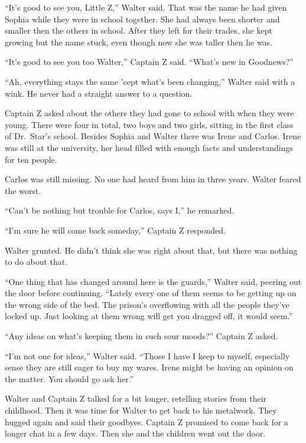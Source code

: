 \documentclass[12pt]{extbook}
\begin{document}
  \enquote{It's good to see you, Little Z,} Walter said. That was the name
  he had given Sophia while they were in school together. She had always
  been shorter and smaller then the others in school. After they left for
  their trades, she kept growing but the name stuck, even though now she
  was taller then he was.
  
  \enquote{It's good to see you too Walter,} Captain Z said.
  \enquote{What's new in Goodnews?}
  
  \enquote{Ah, everything stays the same 'cept what's been changing,}
  Walter said with a wink. He never had a straight answer to a question.
  
  Captain Z asked about the others they had gone to school with when they
  were young. There were four in total, two boys and two girls, sitting in
  the first class of Dr.~Star's school. Besides Sophia and Walter there
  was Irene and Carlos. Irene was still at the university, her head filled
  with enough facts and understandings for ten people.
  
  Carlos was still missing. No one had heard from him in three years.
  Walter feared the worst.
  
  \enquote{Can't be nothing but trouble for Carlos, says I,} he remarked.
  
  \enquote{I'm sure he will come back someday,} Captain Z responded.
  
  Walter grunted. He didn't think she was right about that, but there was
  nothing to do about that.
  
  \enquote{One thing that has changed around here is the guards,} Walter
  said, peering out the door before continuing. \enquote{Lately every one
  of them seems to be getting up on the wrong side of the bed. The
  prison's overflowing with all the people they've locked up. Just looking
  at them wrong will get you dragged off, it would seem.}
  
  \enquote{Any ideas on what's keeping them in such sour moods?} Captain Z
  asked.
  
  \enquote{I'm not one for ideas,} Walter said. \enquote{Those I have I
  keep to myself, especially sense they are still eager to buy my wares.
  Irene might be having an opinion on the matter. You should go ask her.}
  
  Walter and Captain Z talked for a bit longer, retelling stories from
  their childhood. Then it was time for Walter to get back to his
  metalwork. They hugged again and said their goodbyes. Captain Z promised
  to come back for a longer chat in a few days. Then she and the children
  went out the door.
  
\end{document}
